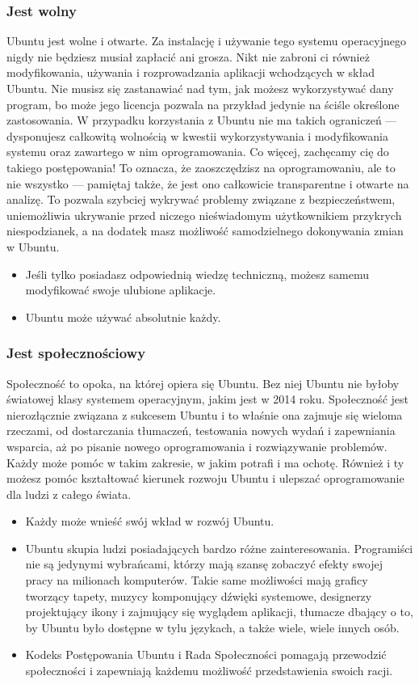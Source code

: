 \subsubsection{Jest wolny}
Ubuntu jest wolne i otwarte. Za instalację i używanie tego systemu operacyjnego nigdy nie będziesz musiał zapłacić ani grosza. Nikt nie zabroni ci również modyfikowania, używania i rozprowadzania aplikacji wchodzących w skład Ubuntu. Nie musisz się zastanawiać nad tym, jak możesz wykorzystywać dany program, bo może jego licencja pozwala na przykład jedynie na ściśle określone zastosowania. W przypadku korzystania z Ubuntu nie ma takich ograniczeń --- dysponujesz całkowitą wolnością w kwestii wykorzystywania i modyfikowania systemu oraz zawartego w nim oprogramowania.
Co więcej, zachęcamy cię do takiego postępowania! To oznacza, że zaoszczędzisz na oprogramowaniu, ale to nie wszystko --- pamiętaj także, że jest ono całkowicie transparentne i otwarte na analizę. To pozwala szybciej wykrywać problemy związane z bezpieczeństwem, uniemożliwia ukrywanie przed niczego nieświadomym użytkownikiem przykrych niespodzianek, a na dodatek masz możliwość samodzielnego dokonywania zmian w Ubuntu.
\begin{itemize}
\item Jeśli tylko posiadasz odpowiednią wiedzę techniczną, możesz samemu modyfikować swoje ulubione aplikacje.
\item Ubuntu może używać absolutnie każdy.
\end{itemize}
\subsubsection{Jest społecznościowy}
Społeczność to opoka, na której opiera się Ubuntu. Bez niej Ubuntu nie byłoby światowej klasy systemem operacyjnym, jakim jest w 2014 roku. Społeczność jest nierozłącznie związana z sukcesem Ubuntu i to właśnie ona zajmuje się wieloma rzeczami, od dostarczania tłumaczeń, testowania nowych wydań i zapewniania wsparcia, aż po pisanie nowego oprogramowania i rozwiązywanie problemów. Każdy może pomóc w takim zakresie, w jakim potrafi i ma ochotę. Również i ty możesz pomóc kształtować kierunek rozwoju Ubuntu i ulepszać oprogramowanie dla ludzi z całego świata.
\begin{itemize}
\item Każdy może wnieść swój wkład w rozwój Ubuntu.
\item Ubuntu skupia ludzi posiadających bardzo różne zainteresowania. Programiści nie są jedynymi wybrańcami, którzy mają szansę zobaczyć efekty swojej pracy na milionach komputerów. Takie same możliwości mają graficy tworzący tapety, muzycy komponujący dźwięki systemowe, designerzy projektujący ikony i zajmujący się wyglądem aplikacji, tłumacze dbający o to, by Ubuntu było dostępne w tylu językach, a także wiele, wiele innych osób.
\item Kodeks Postępowania Ubuntu i Rada Społeczności pomagają przewodzić społeczności i zapewniają każdemu możliwość przedstawienia swoich racji.
\end{itemize}
\clearpage
